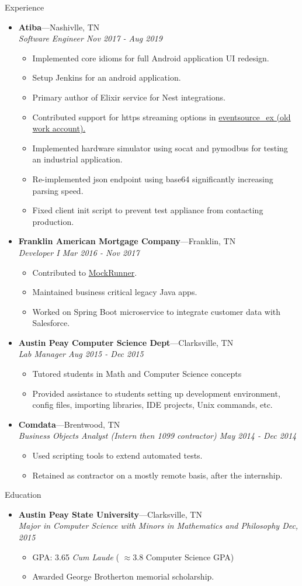 \documentclass[11pt,oneside]{article}
\newenvironment{ressection}[1]{
	\vspace{4pt}
	{\fontfamily{phv}\selectfont\Large#1}
	\begin{itemize}
	\vspace{3pt}
}{
	\end{itemize}
}
\newcommand{\ressubitem}[1]{
	\vspace{-1pt}
	\item \begin{flushleft} #1 \end{flushleft}
}
\newcommand{\resbigitem}[3]{
	\vspace{-5pt}
	\item
	\textbf{#1}---#2 \\
	\textit{#3}
}
\newenvironment{ressubsec}[3]{
	\resbigitem{#1}{#2}{#3}
	\vspace{-2pt}
	\begin{itemize}
}{
	\end{itemize}
}
\begin{document}
\begin{ressection}{Experience}
        \begin{ressubsec}{Atiba}{Nashivlle, TN}{Software Engineer Nov 2017 - Aug 2019} 
		\ressubitem{Implemented core idioms for full Android application UI redesign.}
		\ressubitem{Setup Jenkins for an android application.}
		\ressubitem{Primary author of Elixir service for Nest integrations.} 
        \ressubitem{Contributed support for https streaming options in \href{https://github.com/cwc/eventsource_ex/pull/10/files}{eventsource\_ex (old work account).}}
        \ressubitem{Implemented hardware simulator using socat and pymodbus for testing an industrial application.}
		\ressubitem{Re-implemented json endpoint using base64 significantly increasing parsing speed.}  
		\ressubitem{Fixed client init script to prevent test appliance from contacting production.}
	\end{ressubsec}

			\begin{ressubsec}{Franklin American Mortgage Company}{Franklin, TN}{Developer I Mar 2016 - Nov 2017}
                    \ressubitem{Contributed to \href{https://github.com/mockrunner/mockrunner/pull/42}{MockRunner}.}
		\ressubitem{Maintained business critical legacy Java apps.}
		\ressubitem{Worked on Spring Boot microservice to integrate customer data with Salesforce.}
	\end{ressubsec}


	\begin{ressubsec}{Austin Peay Computer Science Dept}{Clarksville, TN}{Lab Manager Aug 2015 - Dec 2015}
		\ressubitem{Tutored students in Math and Computer Science concepts}
		\ressubitem{Provided assistance to students setting up development environment, config files, importing libraries, IDE projects, Unix commands, etc.}
	\end{ressubsec}

	\begin{ressubsec}{Comdata}{Brentwood, TN}{Business Objects Analyst (Intern then 1099 contractor) May 2014 - Dec 2014}
    \ressubitem{Used scripting tools to extend automated tests.}
    \ressubitem{Retained as contractor on a mostly remote basis, after the internship.}
	\end{ressubsec}

\end{ressection}

\begin{ressection}{Education}

	\begin{ressubsec}{Austin Peay State University}{Clarksville, TN}{Major in Computer Science with Minors in Mathematics and Philosophy Dec, 2015}
		\ressubitem{GPA: 3.65 \textit{Cum Laude} ( $\approx 3.8$ Computer Science GPA)}
		\ressubitem{Awarded George Brotherton memorial scholarship.}
	\end{ressubsec}
\end{ressection}
\end{document}
